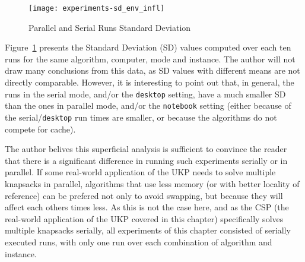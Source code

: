 \begin{figure}[h]
\caption{Parallel and Serial Runs Standard Deviation}
\begin{center}
\texttt{[image: experiments-sd\_env\_infl]}
\end{center}
\label{fig:sd_env_infl}
\end{figure}

Figure~\ref{fig:sd_env_infl} presents the Standard Deviation (SD) values computed over each ten runs for the same algorithm, computer, mode and instance.
The author will not draw many conclusions from this data, as SD values with different means are not directly comparable.
However, it is interesting to point out that, in general, the runs in the serial mode, and/or the \verb+desktop+ setting, have a much smaller SD than the ones in parallel mode, and/or the \verb+notebook+ setting (either because of the serial/\verb+desktop+ run times are smaller, or because the algorithms do not compete for cache).

The author belives this superficial analysis is sufficient to convince the reader that there is a significant difference in running such experiments serially or in parallel.
If some real-world application of the UKP needs to solve multiple knapsacks in parallel, algorithms that use less memory (or with better locality of reference) can be prefered not only to avoid swapping, but because they will affect each others times less.
As this is not the case here, and as the CSP (the real-world application of the UKP covered in this chapter) specifically solves multiple knapsacks serially, all experiments of this chapter consisted of serially executed runs, with only one run over each combination of algorithm and instance.

